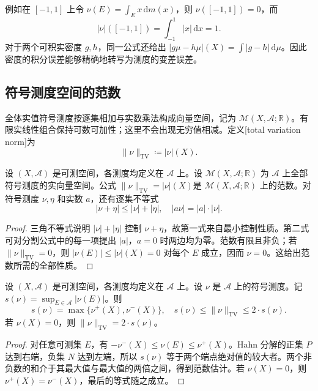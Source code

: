 例如在 \([-1,1]\) 上令 \(\nu(E)=\int_E x\,\mathrm dm(x)\)，则 \(\nu([-1,1])=0\)，而
\[
|\nu|([-1,1])=\int_{-1}^1|x|\,\mathrm dx=1.
\]
对于两个可积实密度 \(g,h\)，同一公式还给出 \(|g\mu-h\mu|(X)=\int|g-h|\,\mathrm d\mu\)。因此密度的积分误差能够精确地转写为测度的变差误差。

\subsection{符号测度空间的范数}
\label{b1:subsec:060203}

全体实值符号测度按逐集相加与实数乘法构成向量空间，记为 \(\mathcal M(X,\mathcal A;\mathbb R)\)。有限实线性组合保持可数可加性；这里不会出现无穷值相减。定义[total variation norm]为
\[
\|\nu\|_{\mathrm{TV}}\coloneqq|\nu|(X).
\]

\begin{proposition}\label{b1:prop:variation-norm}
设 \((X,\mathcal A)\) 是可测空间，各测度均定义在 \(\mathcal A\) 上。设 \(\mathcal M(X,\mathcal A;\mathbb R)\) 为 \(\mathcal A\) 上全部符号测度的实向量空间。公式 \(\|\nu\|_{\mathrm{TV}}=|\nu|(X)\)是 \(\mathcal M(X,\mathcal A;\mathbb R)\) 上的范数。对符号测度 \(\nu,\eta\) 和实数 \(a\)，还有逐集不等式
\[
|\nu+\eta|\leq|\nu|+|\eta|,\quad |a\nu|=|a|\cdot|\nu|.
\]
\end{proposition}
\begin{proof}
三角不等式说明 \(|\nu|+|\eta|\) 控制 \(\nu+\eta\)，故第一式来自最小控制性质。第二式可对分割公式中的每一项提出 \(|a|\)，\(a=0\) 时两边均为零。范数有限且非负；若 \(\|\nu\|_{\mathrm{TV}}=0\)，则 \(|\nu(E)|\leq|\nu|(X)=0\) 对每个 \(E\) 成立，因而 \(\nu=0\)。这给出范数所需的全部性质。
\end{proof}

\begin{proposition}\label{b1:prop:variation-uniform-comparison}
设 \((X,\mathcal A)\) 是可测空间，各测度均定义在 \(\mathcal A\) 上。设 \(\nu\) 是 \(\mathcal A\) 上的符号测度。记 \(s(\nu)=\sup_{E\in\mathcal A}|\nu(E)|\)。则
\[
s(\nu)=\max\{\nu^+(X),\nu^-(X)\},\quad
s(\nu)\leq\|\nu\|_{\mathrm{TV}}\leq2\cdot s(\nu).
\]
若 \(\nu(X)=0\)，则 \(\|\nu\|_{\mathrm{TV}}=2\cdot s(\nu)\)。
\end{proposition}
\begin{proof}
对任意可测集 \(E\)，有 \(-\nu^-(X)\leq\nu(E)\leq\nu^+(X)\)。Hahn 分解的正集 \(P\) 达到右端，负集 \(N\) 达到左端，所以 \(s(\nu)\) 等于两个端点绝对值的较大者。两个非负数的和介于其最大值与最大值的两倍之间，得到范数估计。若 \(\nu(X)=0\)，则 \(\nu^+(X)=\nu^-(X)\)，最后的等式随之成立。
\end{proof}

